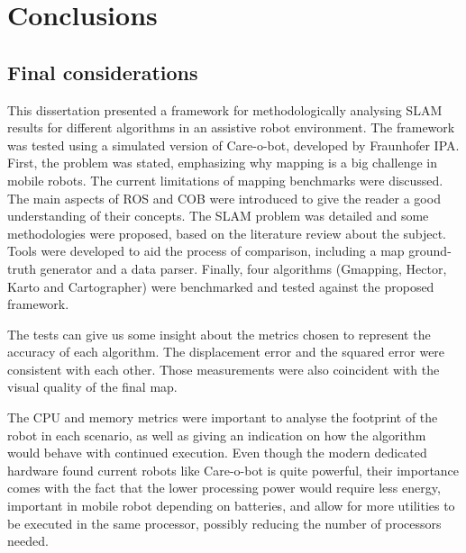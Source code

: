 \chapter{Conclusions}\label{chp:conclusoes}


\section{Final considerations}

This dissertation presented a framework for methodologically analysing SLAM results for different algorithms in an assistive robot environment. The framework was tested using a simulated version of Care-o-bot, developed by Fraunhofer IPA. First, the problem was stated, emphasizing why mapping is a big challenge in mobile robots. The current limitations of mapping benchmarks were discussed. The main aspects of ROS and COB were introduced to give the reader a good understanding of their concepts. The SLAM problem was detailed and some methodologies were proposed, based on the literature review about the subject. Tools were developed to aid the process of comparison, including a map ground-truth generator and a data parser. Finally, four algorithms (Gmapping, Hector, Karto and Cartographer) were benchmarked and tested against the proposed framework.

The tests can give us some insight about the metrics chosen to represent the accuracy of each algorithm. The displacement error and the squared error were consistent with each other. Those measurements were also coincident with the visual quality of the final map.

The CPU and memory metrics were important to analyse the footprint of the robot in each scenario, as well as giving an indication on how the algorithm would behave with continued execution. Even though the modern dedicated hardware found current robots like Care-o-bot is quite powerful, their importance comes with the fact that the lower processing power would require less energy, important in mobile robot depending on batteries, and allow for more utilities to be executed in the same processor, possibly reducing the number of processors needed.

